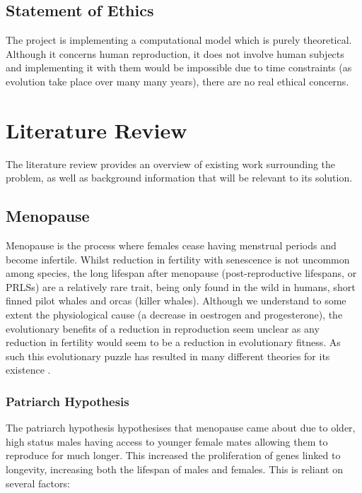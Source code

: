 \documentclass[authoryearcitations]{UoYCSproject}
\begin{document}
\section{Statement of Ethics}
The project is implementing a computational model which is purely theoretical. Although it concerns human reproduction, it does not involve human subjects and implementing it with them would be impossible due to time constraints (as evolution take place over many many years), there are no real ethical concerns.

\chapter{Literature Review}
\label{cha:Literature Review}
The literature review provides an overview of existing work surrounding the problem, as well as background information that will be relevant to its solution. 

\section{Menopause}
Menopause is the process where females cease having menstrual periods and become infertile. Whilst reduction in fertility with senescence is not uncommon among species, the long lifespan after menopause (post-reproductive lifespans, or PRLSs) are a relatively rare trait, being only found in the wild in humans, short finned pilot whales and orcas (killer whales). Although we understand to some extent the physiological cause (a decrease in oestrogen and progesterone), the evolutionary benefits of a reduction in reproduction seem unclear as any reduction in fertility would seem to be a reduction in evolutionary fitness. As such this evolutionary puzzle has resulted in many different theories for its existence \cite{evolutionPRLS2015}.  

\subsection{Patriarch Hypothesis}
The patriarch hypothesis \cite{patriarchHypothesis2000} hypothesises that menopause came about due to older, high status males having access to younger female mates allowing them to reproduce for much longer. This increased the proliferation of genes linked to longevity, increasing both the lifespan of males and females. This is reliant on several factors: 
\end{document}
